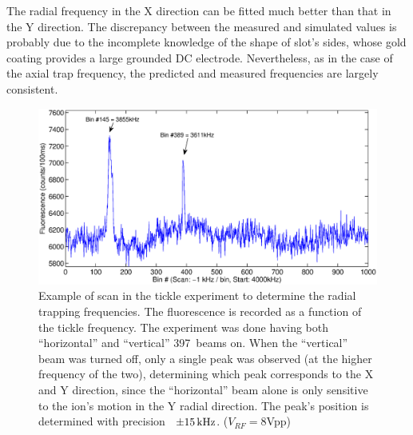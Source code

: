 The radial frequency in the X direction can be fitted much better than that in the Y direction. The discrepancy between the measured and simulated values is probably due to the incomplete knowledge of the shape of slot's sides, whose gold coating provides a large grounded DC electrode. Nevertheless, as in the case of the axial trap frequency, the predicted and measured frequencies are largely consistent. 


\begin{figure}[h!t]
\centering
\includegraphics[width=13.5cm]{chapter6/tickle/ticklescan}
\caption[Example scan of tickle experiment determining trap frequencies.]{Example of scan in the tickle experiment to determine the radial trapping frequencies. The fluorescence is recorded as a function of the tickle frequency. The experiment was done having both ``horizontal'' and ``vertical'' 397\nm\, beams on. When the ``vertical'' beam was turned off, only a single peak was observed (at the higher frequency of the two), determining which peak corresponds to the X and Y direction, since the ``horizontal'' beam alone is only sensitive to the ion's motion in the Y radial direction. The peak's position is determined with precision ~$\pm 15 \,\mbox{kHz}$.  ($V_{RF} = 8$Vpp)}
\label{fig:ticklescan}
\end{figure} 




